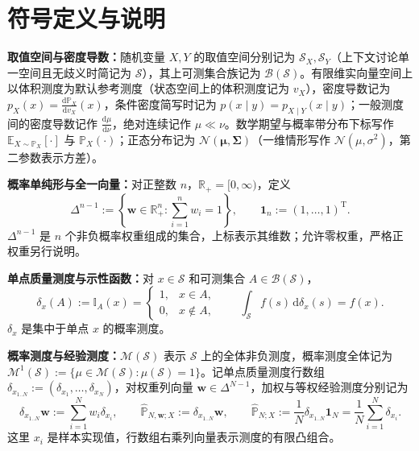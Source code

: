 \section{符号定义与说明}\label{cw:app:notation}

\textbf{取值空间与密度导数：}随机变量 $X,Y$ 的取值空间分别记为 $\mathcal S_X,\mathcal S_Y$（上下文讨论单一空间且无歧义时简记为 $\mathcal S$），其上可测集合族记为 $\mathcal B(\mathcal S)$。有限维实向量空间上以体积测度为默认参考测度（状态空间上的体积测度记为 $v_X$），密度导数记为 $p_X(x)=\frac{\mathrm d\mathbb P_X}{\mathrm dv_X}(x)$，条件密度简写时记为 $p(x\mid y)=p_{X\mid Y}(x\mid y)$；一般测度间的密度导数记作 $\frac{\mathrm d\mu}{\mathrm d\nu}$，绝对连续记作 $\mu\ll\nu$。数学期望与概率带分布下标写作 $\mathbb E_{X\sim\mathbb P_X}[\cdot]$ 与 $\mathbb P_X(\cdot)$；正态分布记为 $\mathcal N(\bm\mu,\bm\Sigma)$（一维情形写作 $\mathcal N(\mu,\sigma^2)$，第二参数表示方差）。

\textbf{概率单纯形与全一向量：}对正整数 $n$，$\mathbb R_+=[0,\infty)$，定义
\begin{equation*}
\Delta^{n-1}:=\left\{\bm w\in\mathbb R_+^n:\sum_{i=1}^n w_i=1\right\},\qquad
\mathbf1_n:=(1,\dots,1)^{\mathrm T}.
\end{equation*}
$\Delta^{n-1}$ 是 $n$ 个非负概率权重组成的集合，上标表示其维数；允许零权重，严格正权重另行说明。

\textbf{单点质量测度与示性函数：}对 $x\in\mathcal S$ 和可测集合 $A\in\mathcal B(\mathcal S)$，
\begin{equation*}
\delta_x(A):=\mathbb I_A(x)=
\begin{cases}1,&x\in A,\\0,&x\notin A,\end{cases}
\qquad \int_{\mathcal S}f(s)\,\mathrm d\delta_x(s)=f(x).
\end{equation*}
$\delta_x$ 是集中于单点 $x$ 的概率测度。

\textbf{概率测度与经验测度：}$\mathcal M(\mathcal S)$ 表示 $\mathcal S$ 上的全体非负测度，概率测度全体记为 $\mathcal M^1(\mathcal S):=\{\mu\in\mathcal M(\mathcal S):\mu(\mathcal S)=1\}$。记单点质量测度行数组 $\delta_{x_{1..N}}:=(\delta_{x_1},\dots,\delta_{x_N})$，对权重列向量 $\bm w\in\Delta^{N-1}$，加权与等权经验测度分别记为
\begin{equation*}
\delta_{x_{1..N}}\bm w:=\sum_{i=1}^Nw_i\delta_{x_i},\qquad
\hat{\mathbb P}_{N,\bm w;X}:=\delta_{x_{1..N}}\bm w,\qquad
\hat{\mathbb P}_{N;X}:=\frac1N\delta_{x_{1..N}}\mathbf1_N=\frac1N\sum_{i=1}^N\delta_{x_i}.
\end{equation*}
这里 $x_i$ 是样本实现值，行数组右乘列向量表示测度的有限凸组合。

